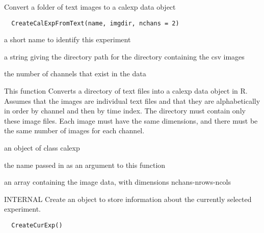\documentclass[a4paper]{book}
\begin{document}
%
\begin{Description}\relax
Convert a folder of text images to a calexp data object
\end{Description}
%
\begin{Usage}
\begin{verbatim}
  CreateCalExpFromText(name, imgdir, nchans = 2)
\end{verbatim}
\end{Usage}
%
\begin{Arguments}
\begin{ldescription}
\item[\code{name}] a short name to identify this experiment

\item[\code{imgdir}] a string giving the directory path for the
directory containing the csv images

\item[\code{nchans}] the number of channels that exist in the
data
\end{ldescription}
\end{Arguments}
%
\begin{Details}\relax
This function Converts a directory of text files into a
calexp data object in R. Assumes that the images are
individual text files and that they are alphabetically in
order by channel and then by time index.  The directory
must contain only these image files. Each image must have
the same dimensions, and there must be the same number of
images for each channel.
\end{Details}
%
\begin{Value}
an object of class calexp \begin{ldescription}
\item[\code{name}] the name passed in
as an argument to this function\item[\code{data}] an array
containing the image data, with dimensions
nchans-nrows-ncols
\end{ldescription}
\end{Value}
%
\begin{Description}\relax
INTERNAL Create an object to store information about the
currently selected experiment.
\end{Description}
%
\begin{Usage}
\begin{verbatim}
  CreateCurExp()
\end{verbatim}
\end{Usage}
\end{document}
